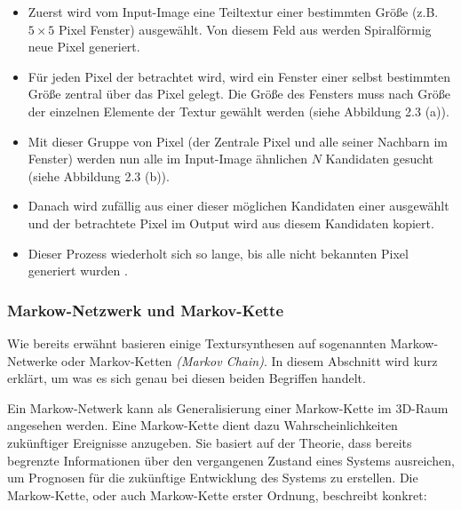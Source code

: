 \documentclass[12pt, a4paper,twoside,openany]{report} %
\begin{document}
\begin{itemize}
    \item Zuerst wird vom Input-Image eine Teiltextur einer bestimmten Größe {(z.B. $5\times 5$ Pixel Fenster)} ausgewählt. Von diesem Feld aus werden Spiralförmig neue Pixel generiert.
    \item Für jeden Pixel der betrachtet wird, wird ein Fenster einer selbst bestimmten Größe zentral über das Pixel gelegt. 
    Die Größe des Fensters muss nach Größe der einzelnen Elemente der Textur gewählt werden  {(siehe Abbildung 2.3 (a))}.
    \item Mit dieser Gruppe von Pixel {(der Zentrale Pixel und alle seiner Nachbarn im Fenster)} werden nun alle im Input-Image ähnlichen $N$ Kandidaten gesucht {(siehe Abbildung 2.3 (b))}.
    \item Danach wird zufällig aus einer dieser möglichen Kandidaten einer ausgewählt und der betrachtete Pixel im Output wird aus diesem Kandidaten kopiert.
    \item Dieser Prozess wiederholt sich so lange, bis alle nicht bekannten Pixel generiert wurden \cite[S.4]{GomathiShah2009}.
\end{itemize}

\subsubsection{Markow-Netzwerk und Markov-Kette}

Wie bereits erwähnt basieren einige Textursynthesen auf sogenannten Markow-Netwerke oder Markov-Ketten \textit{(Markov Chain)}.
In diesem Abschnitt wird kurz erklärt, um was es sich genau bei diesen beiden Begriffen handelt.\par
Ein Markow-Netwerk kann als Generalisierung einer Markow-Kette im 3D-Raum angesehen werden.
Eine Markow-Kette dient dazu Wahrscheinlichkeiten zukünftiger Ereignisse anzugeben.
Sie basiert auf der Theorie, dass bereits begrenzte Informationen über den vergangenen Zustand eines Systems ausreichen,
um Prognosen für die zukünftige Entwicklung des Systems zu erstellen.
Die Markow-Kette, oder auch Markow-Kette erster Ordnung, beschreibt konkret:
 \cite{wiki:Markow-Kette}
\end{document}
